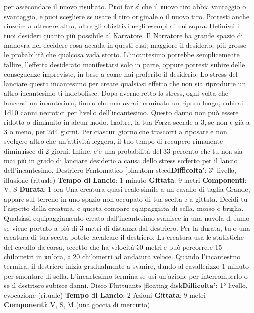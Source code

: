 \begin{multicols}{2}
per assecondare il nuovo risultato. Puoi far sì che il
nuovo tiro abbia vantaggio o svantaggio, e puoi
scegliere se usare il tiro originale o il nuovo tiro.
Potresti anche riuscire a ottenere altro, oltre gli obiettivi
negli esempi di cui sopra. Definisci i tuoi desideri
quanto più possibile al Narratore. Il Narratore ha grande spazio di
manovra nel decidere cosa accada in questi casi;
maggiore il desiderio, più grosse le probabilità che
qualcosa vada storto. L’incantesimo potrebbe
semplicemente fallire, l’effetto desiderato manifestarsi
solo in parte, oppure potresti subire delle conseguenze
impreviste, in base a come hai proferito il desiderio.
Lo stress del lanciare questo incantesimo per creare
qualsiasi effetto che non sia riprodurre un altro
incantesimo ti indebolisce. Dopo averne retto lo stress,
ogni volta che lancerai un incantesimo, fino a che non
avrai terminato un riposo lungo, subirai 1d10 danni
necrotici per livello dell’incantesimo. Questo danno non
può essere ridotto o diminuito in alcun modo. Inoltre, la
tua Forza scende a 3, se non è già a 3 o meno, per 2d4
giorni. Per ciascun giorno che trascorri a riposare e non
svolgere altro che un’attività leggera, il tuo tempo di
recupero rimanente diminuisce di 2 giorni. Infine, c’è
una probabilità del 33 percento che tu non sia mai più in
grado di lanciare desiderio a causa dello stress sofferto
per il lancio dell’incantesimo.
Destriero Fantomatico
[phantom steed\textbf{Difficolta'}:
3° livello, illusione (rituale)
\textbf{Tempo di Lancio}: 1 minuto
\textbf{Gittata}: 9 metri
\textbf{Componenti}: V, S
\textbf{Durata}: 1 ora
Una creatura quasi reale simile a un cavallo di taglia
Grande, appare sul terreno in uno spazio non occupato
di tua scelta e a gittata. Decidi tu l’aspetto della
creatura, e questa compare equipaggiata di sella,
morso e briglia. Qualsiasi equipaggiamento creato
dall’incantesimo svanisce in una nuvola di fumo se
viene portato a più di 3 metri di distanza dal destriero.
Per la durata, tu o una creatura di tua scelta potete
cavalcare il destriero. La creatura usa le statistiche del
cavallo da corsa, eccetto che ha velocità 30 metri e può
percorrere 15 chilometri in un’ora, o 20 chilometri ad
andatura veloce. Quando l’incantesimo termina, il
destriero inizia gradualmente a svanire, dando al
cavallerizzo 1 minuto per smontare di sella.
L’incantesimo termina se usi un’azione per
interromperlo o se il destriero subisce danni.
Disco Fluttuante
[floating disk\textbf{Difficolta'}:
1° livello, evocazione (rituale)
\textbf{Tempo di Lancio}: 2 Azioni
\textbf{Gittata}: 9 metri
\textbf{Componenti}: V, S, M (una goccia di mercurio)

\end{multicols}
